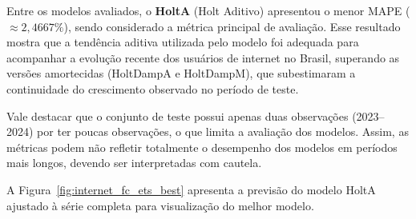 \documentclass[12pt, a4paper]{article}
\begin{document}
\begin{table}[H]
 \centering
  \caption{Métricas de acurácia dos modelos ETS no conjunto de teste.}
  \label{tab:acuracia_internet_ets}
\end{table}


Entre os modelos avaliados, o \textbf{HoltA} (Holt Aditivo) apresentou o menor MAPE ($\approx 2,4667\%$), sendo considerado a métrica principal de avaliação. Esse resultado mostra que a tendência aditiva utilizada pelo modelo foi adequada para acompanhar a evolução recente dos usuários de internet no Brasil, superando as versões amortecidas (HoltDampA e HoltDampM), que subestimaram a continuidade do crescimento observado no período de teste.

Vale destacar que o conjunto de teste possui apenas duas observações (2023--2024) por ter poucas observações, o que limita a avaliação dos modelos. Assim, as métricas podem não refletir totalmente o desempenho dos modelos em períodos mais longos, devendo ser interpretadas com cautela.

A Figura~\ref{fig:internet_fc_ets_best} apresenta a previsão do modelo HoltA ajustado à série completa para visualização do melhor modelo.
\end{document}
